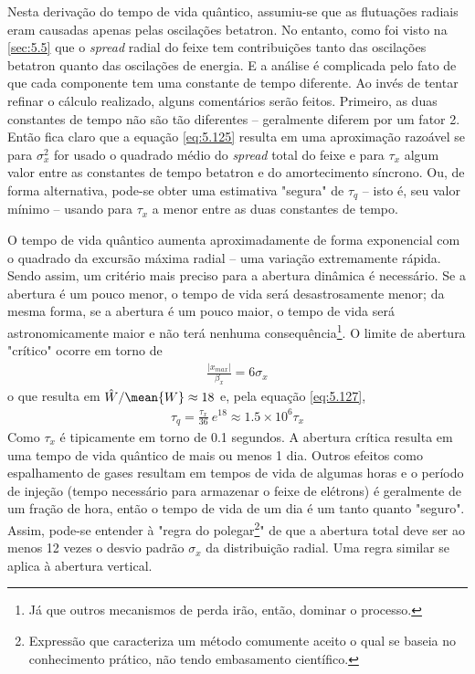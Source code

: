 Nesta derivação do tempo de vida quântico, assumiu-se que as flutuações radiais eram causadas apenas pelas oscilações betatron. No entanto, como foi visto na \autoref{sec:5.5} que o \textit{spread} radial do feixe tem contribuições tanto das oscilações betatron quanto das oscilações de energia. E a análise é complicada pelo fato de que cada componente tem uma constante de tempo diferente. Ao invés de tentar refinar o cálculo realizado, alguns comentários serão feitos. Primeiro, as duas constantes de tempo não são tão diferentes -- geralmente diferem por um fator 2. Então fica claro que a equação \eqref{eq:5.125} resulta em uma aproximação razoável se para $\sigma_x^2$ for usado o quadrado médio do \textit{spread} total do feixe e para $\tau_x$ algum valor entre as constantes de tempo betatron e do amortecimento síncrono. Ou, de forma alternativa, pode-se obter uma estimativa "segura" de $\tau_q$ -- isto é, seu valor mínimo -- usando para $\tau_x$ a menor entre as duas constantes de tempo.

O tempo de vida quântico aumenta aproximadamente de forma exponencial com o quadrado da excursão máxima radial --  uma variação extremamente rápida. Sendo assim, um critério mais preciso para a abertura dinâmica é necessário. Se a abertura é um pouco menor, o tempo de vida será desastrosamente menor; da mesma forma, se a abertura é um pouco maior, o tempo de vida será astronomicamente maior e não terá nenhuma consequência\footnote{Já que outros mecanismos de perda irão, então, dominar o processo.}. O limite de abertura "crítico" ocorre em torno de
\begin{align}
	\frac{|x_{max}|}{\beta_x} = 6\sigma_x
\end{align}
o que resulta em $\hat{W}/\mean{W} \approx 18$ e, pela equação \eqref{eq:5.127},
\begin{align}
	\tau_q = \frac{\tau_x}{36}\ e^{18} \approx 1.5 \times 10^6 \tau_x
\end{align}
Como $\tau_x$ é tipicamente em torno de 0.1 segundos. A abertura crítica resulta em uma tempo de vida quântico de mais ou menos 1 dia. Outros efeitos como espalhamento de gases resultam em tempos de vida de algumas horas e o período de injeção (tempo necessário para armazenar o feixe de elétrons) é geralmente de um fração de hora, então o tempo de vida de um dia é um tanto quanto "seguro". Assim, pode-se entender à "regra do polegar\footnote{Expressão que caracteriza um método comumente aceito o qual se baseia no conhecimento prático, não tendo embasamento científico.}" de que a abertura total deve ser ao menos 12 vezes o desvio padrão $\sigma_x$ da distribuição radial. Uma regra similar se aplica à abertura vertical.